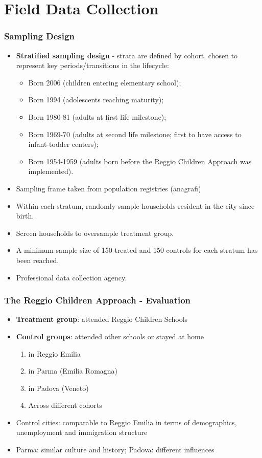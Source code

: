 \documentclass[xcolor=table]{beamer}
\begin{document}
\section{Field Data Collection}
\begin{frame}
\frametitle{Sampling Design}
\begin{itemize}
\item\textbf{Stratified sampling design} - strata are defined by cohort, chosen to represent key periods/transitions in the lifecycle:
\begin{itemize}
\item Born 2006 (children entering elementary school);
\item Born 1994 (adolescents reaching maturity);
\item Born 1980-81 (adults at first life milestone);
\item Born 1969-70 (adults at second life milestone; first to have access to infant-todder centers);
\item Born 1954-1959 (adults born before the Reggio Children Approach was implemented).
\end{itemize}
\item Sampling frame taken from population registries (anagrafi)
\item Within each stratum, randomly sample households resident in the city since birth.
\item Screen households to oversample treatment group.
\item A minimum sample size of 150 treated and 150 controls for each stratum has been reached.
\item Professional data collection agency.
\end{itemize}
\end{frame} 
\begin{frame}
\frametitle{The Reggio Children Approach - Evaluation} 
\begin{itemize}

\item\textbf{Treatment group}: attended Reggio Children Schools
\smallskip
\item\textbf{Control groups}: attended other schools or stayed at home
\begin{enumerate}
\item in Reggio Emilia
\item in Parma (Emilia Romagna) 
\item in Padova (Veneto)
\item Across different cohorts
\end{enumerate}
\vspace{3ex}
\item Control cities: comparable to Reggio Emilia in terms of demographics, unemployment and immigration structure
\item Parma: similar culture and history; Padova: different influences
\end{itemize}
\end{frame} 
\end{document}
